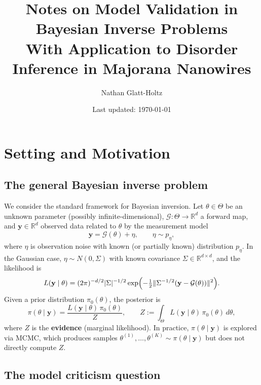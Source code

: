 \documentclass[11pt]{article}
\title{Notes on Model Validation in Bayesian Inverse Problems\\[6pt]
\large With Application to Disorder Inference in Majorana Nanowires}
\author{Nathan Glatt-Holtz}
\date{Last updated: \today}
\newcommand{\R}{\mathbb{R}}
\newcommand{\cG}{\mathcal{G}}
\theoremstyle{plain}
\theoremstyle{remark}
\theoremstyle{definition}
\begin{document}
\maketitle
\tableofcontents

\section{Setting and Motivation}

\subsection{The general Bayesian inverse problem}

We consider the standard framework for Bayesian inversion. Let 
$\theta \in \Theta$ be an unknown parameter (possibly infinite-dimensional), 
$\cG: \Theta \to \R^d$ a forward map, and $\mathbf{y} \in \R^d$ observed 
data related to $\theta$ by the measurement model
\begin{equation}\label{eq:measurement}
\mathbf{y} = \cG(\theta) + \eta, \qquad \eta \sim p_\eta,
\end{equation}
where $\eta$ is observation noise with known (or partially known) distribution 
$p_\eta$. In the Gaussian case, $\eta \sim N(0, \Sigma)$ with known covariance 
$\Sigma \in \R^{d \times d}$, and the likelihood is
\begin{equation}\label{eq:likelihood}
L(\mathbf{y} \mid \theta) = (2\pi)^{-d/2}|\Sigma|^{-1/2}
\exp\Bigl(-\tfrac{1}{2}\|\Sigma^{-1/2}(\mathbf{y} - \cG(\theta))\|^2\Bigr).
\end{equation}
Given a prior distribution $\pi_0(\theta)$, the posterior is
\begin{equation}\label{eq:posterior}
\pi(\theta \mid \mathbf{y}) = \frac{L(\mathbf{y} \mid \theta)\,\pi_0(\theta)}{Z},
\qquad Z := \int_\Theta L(\mathbf{y} \mid \theta)\,\pi_0(\theta)\,d\theta,
\end{equation}
where $Z$ is the \textbf{evidence} (marginal likelihood). In practice, 
$\pi(\theta \mid \mathbf{y})$ is explored via MCMC, which produces samples 
$\theta^{(1)}, \ldots, \theta^{(K)} \sim \pi(\theta \mid \mathbf{y})$ but 
does not directly compute $Z$.

\subsection{The model criticism question}
\end{document}
